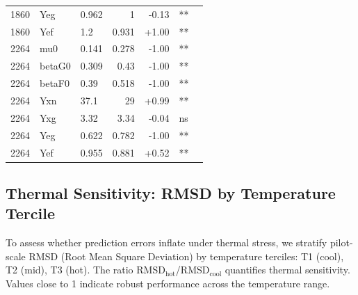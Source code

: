 \begin{table}[H]
\begin{tabular}{lllrrll}
1860 & Yeg &        0.962 &            1 &       -0.13 &       ** \\
1860 & Yef &          1.2 &        0.931 &       +1.00 &       ** \\
2264 & mu0 &        0.141 &        0.278 &       -1.00 &       ** \\
2264 & betaG0 &        0.309 &         0.43 &       -1.00 &       ** \\
2264 & betaF0 &         0.39 &        0.518 &       -1.00 &       ** \\
2264 & Yxn &         37.1 &           29 &       +0.99 &       ** \\
2264 & Yxg &         3.32 &         3.34 &       -0.04 &       ns \\
2264 & Yeg &        0.622 &        0.782 &       -1.00 &       ** \\
2264 & Yef &        0.955 &        0.881 &       +0.52 &       ** \\
\bottomrule
\end{tabular}
\end{table}

\vspace{12pt}

\subsection*{Thermal Sensitivity: RMSD by Temperature Tercile}

To assess whether prediction errors inflate under thermal stress, we stratify pilot-scale 
RMSD (Root Mean Square Deviation) by temperature terciles: T1 (cool), T2 (mid), T3 (hot). 
The ratio RMSD$_{\mathrm{hot}}$/RMSD$_{\mathrm{cool}}$ quantifies thermal sensitivity. 
Values close to 1 indicate robust performance across the temperature range.

